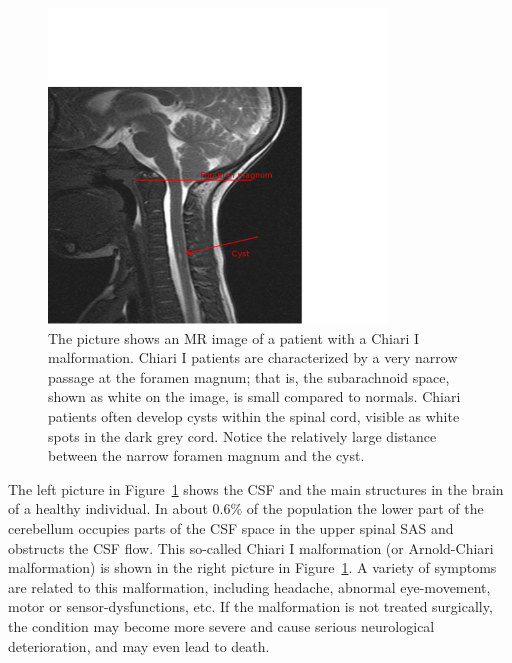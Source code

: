 \begin{figure}
\center\includegraphics[width=0.8\textwidth]{chapters/hentschel/pdf/ChiariImage2.pdf}
\caption{The picture shows an MR image of a patient with a Chiari I
malformation. Chiari I patients are characterized by a very narrow
passage at the foramen magnum; that is, the subarachnoid space, shown
as white on the image, is small compared to normals. Chiari patients
often develop cysts within the spinal cord, visible as white spots in
the dark grey cord. Notice the relatively large distance between the
narrow foramen magnum and the cyst.}
\label{fig:anatomy}
\end{figure}

The left picture in Figure~\ref{fig:anatomy} shows the CSF and the
main structures in the brain of a healthy individual. In about 0.6\%
of the population the lower part of the cerebellum occupies parts of
the CSF space in the upper spinal SAS and obstructs the CSF flow. This
so-called Chiari I malformation  (or
Arnold-Chiari malformation) is shown in the right picture in
Figure~\ref{fig:anatomy}. A variety of symptoms are related to this
malformation, including headache, abnormal eye-movement, motor or
sensor-dysfunctions, etc. If the malformation is not treated
surgically, the condition may become more severe and cause serious
neurological deterioration, and may even lead to death.

